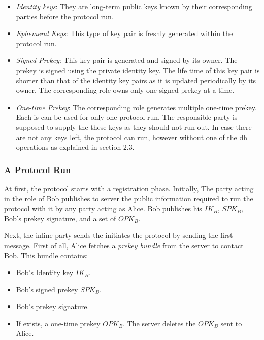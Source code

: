 \begin{itemize}
	\item \textit{Identity keys}: They are long-term public keys known by their corresponding parties before the protocol run.
	\item \textit{Ephemeral Keys}: This type of key pair is freshly generated within the protocol run.
	\item \textit{Signed Prekey}: This key pair is generated and signed by its owner. The prekey is signed using the private identity key. The life time of this key pair is shorter than that of the identity key pairs as it is updated periodically by its owner. The corresponding role owns only one signed prekey at a time.
	\item \textit{One-time Prekey}: The corresponding role generates multiple one-time prekey. Each is can be used for only one protocol run. The responsible party is supposed to supply the these keys as they should not run out. In case there are not any keys left, the protocol can run, however without one of the \gls{dh} operations as explained in section 2.3.
\end{itemize}

\subsubsection{A Protocol Run}
At first, the protocol starts with a registration phase. Initially, The party acting in the role of Bob publishes to server the public information required to run the protocol with it by any party acting as Alice. Bob publishes his $ IK_{B} $, $ SPK_{B} $, Bob's prekey signature, and a set of $ OPK_{B} $.

\par
Next, the inline party sends the initiates the protocol by sending the first message. First of all, Alice fetches a \textit{prekey bundle} from the server to contact Bob. This bundle contains:
\begin{itemize}
	\item Bob's Identity key $ IK_{B} $.
	\item Bob's signed prekey $ SPK_{B} $.
	\item Bob's prekey signature.
	\item If exists, a one-time prekey $ OPK_{B} $. The server deletes the $ OPK_{B} $ sent to Alice.
\end{itemize}


